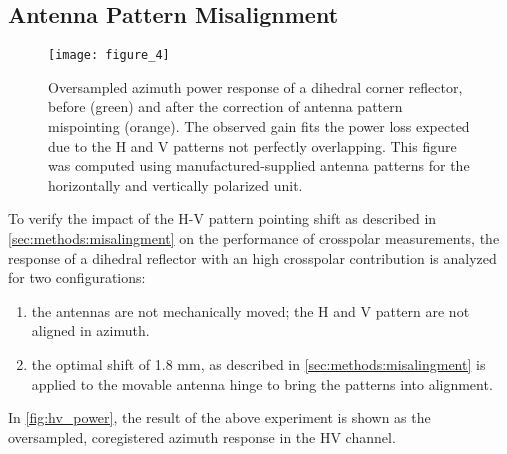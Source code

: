 \subsection{Antenna Pattern Misalignment}\label{sec:results:misalignment}
\begin{figure}[ht!]
	\centering
	\texttt{[image: figure\_4]}
	\caption{Oversampled azimuth power response of a dihedral corner reflector, before (green) and after the correction of antenna pattern mispointing (orange). The observed gain fits the power loss expected due to the H and V patterns not perfectly overlapping. This figure was computed using manufactured-supplied antenna patterns for the horizontally and vertically polarized unit.}
	\label{fig:hv_power}
\end{figure}
To verify the impact of the H-V pattern pointing shift as described in \autoref{sec:methods:misalingment} on the performance of crosspolar measurements, the response of a dihedral reflector with an high crosspolar contribution is analyzed for two configurations:\\ 
\begin{enumerate}
	\item the antennas are not mechanically moved; the H and V pattern are not aligned in azimuth.
	\item the optimal shift of 1.8 mm, as described in \autoref{sec:methods:misalingment} is applied to the movable antenna hinge to bring the patterns into alignment.\\ 
\end{enumerate}
In \autoref{fig:hv_power}, the result of the above experiment is shown as the oversampled, coregistered azimuth response in the HV channel.
